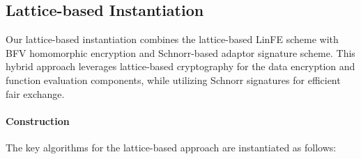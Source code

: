 \subsection{Lattice-based Instantiation}\label{lattice_instantiation(BFV)}
Our lattice-based instantiation combines the lattice-based LinFE scheme with BFV homomorphic encryption and Schnorr-based adaptor signature scheme. This hybrid approach leverages lattice-based cryptography for the data encryption and function evaluation components, while utilizing Schnorr signatures for efficient fair exchange.


\paragraph{Construction}
The key algorithms for the lattice-based approach are instantiated as follows:


